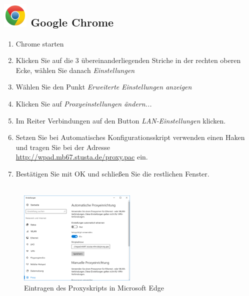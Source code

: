 \documentclass[a4paper,12pt]{scrartcl}
\begin{document}
\subsection*{\includegraphics[height=1.2cm,keepaspectratio]{Bilder/Chrome_2011_logo} Google Chrome}
\begin{enumerate}
	\item Chrome starten
	\item Klicken Sie auf die 3 übereinanderliegenden Striche in der rechten oberen Ecke, wählen Sie danach \emph{Einstellungen}
	\item Wählen Sie den Punkt \emph{Erweiterte Einstellungen anzeigen}
	\item Klicken Sie auf \emph{Proxyeinstellungen ändern...}
	\item Im Reiter Verbindungen auf den Button \emph{LAN-Ein\-stellungen} klicken.
	\item Setzen Sie bei Automatisches Konfigurationsskript verwenden einen Haken und tragen Sie bei der Adresse \\ \url{http://wpad.mb67.stusta.de/proxy.pac} ein.
	\item Bestätigen Sie mit OK und schließen Sie die restlichen Fenster.
	\\
	\\
\end{enumerate}


\begin{figure}
	\begin{center}
		\includegraphics[width=0.5\textwidth,keepaspectratio]{Bilder/Proxy_Edge_mb}
	\end{center}
	\caption{Eintragen des Proxyskripts in Microsoft Edge}
\end{figure}
\end{document}
